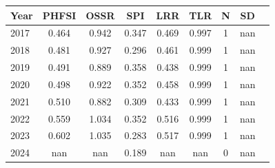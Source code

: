 \begin{tabular}{lcccccccc}
\toprule
Year & PHFSI & OSSR & SPI & LRR & TLR & N & SD \\
\midrule
2017 & 0.464 & 0.942 & 0.347 & 0.469 & 0.997 & 1 & nan \\
2018 & 0.481 & 0.927 & 0.296 & 0.461 & 0.999 & 1 & nan \\
2019 & 0.491 & 0.889 & 0.358 & 0.438 & 0.999 & 1 & nan \\
2020 & 0.498 & 0.922 & 0.352 & 0.458 & 0.999 & 1 & nan \\
2021 & 0.510 & 0.882 & 0.309 & 0.433 & 0.999 & 1 & nan \\
2022 & 0.559 & 1.034 & 0.352 & 0.516 & 0.999 & 1 & nan \\
2023 & 0.602 & 1.035 & 0.283 & 0.517 & 0.999 & 1 & nan \\
2024 & nan & nan & 0.189 & nan & nan & 0 & nan \\
\bottomrule
\end{tabular}